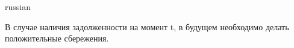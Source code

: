 \documentclass{article}
\begin{document}
\begin{otherlanguage*}{russian}
\begin{enumerate}
В случае наличия задолженности на момент t, в будущем необходимо делать положительные сбережения. 
\end{enumerate}
\end{otherlanguage*}
\end{document}
